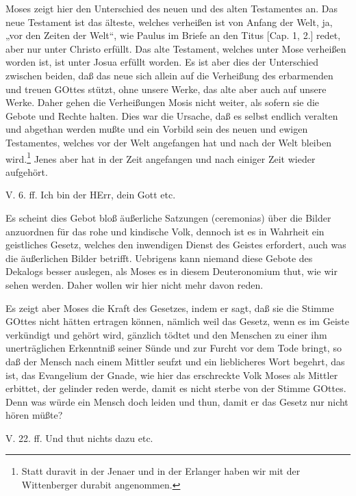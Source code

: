 Moses zeigt hier den Unterschied des neuen und des alten Testamentes an. Das neue Testament ist das älteste, welches verheißen ist von Anfang der Welt, ja, „vor den Zeiten der Welt“, wie Paulus im Briefe an den Titus [Cap. 1, 2.] redet, aber nur unter Christo erfüllt. Das alte Testament, welches unter Mose verheißen worden ist, ist unter Josua erfüllt worden. Es ist aber dies der Unterschied zwischen beiden, daß das neue sich allein auf die Verheißung des erbarmenden und treuen GOttes stützt, ohne unsere Werke, das alte aber auch auf unsere Werke. Daher gehen die Verheißungen Mosis nicht weiter, als sofern sie die Gebote und Rechte halten. Dies war die Ursache, daß es selbst endlich veralten und abgethan werden mußte und ein Vorbild sein des neuen und ewigen Testamentes, welches vor der Welt angefangen hat und nach der Welt bleiben wird.\footnote{Statt duravit in der Jenaer und in der Erlanger haben wir mit der Wittenberger durabit angenommen.} Jenes aber hat in der Zeit angefangen und nach einiger Zeit wieder aufgehört.

\begin{schriftzitat}
V. 6. ff. Ich bin der HErr, dein Gott etc.
\end{schriftzitat}

Es scheint dies Gebot bloß äußerliche Satzungen (ceremonias) über die Bilder anzuordnen für das rohe und kindische Volk, dennoch ist es in Wahrheit ein geistliches Gesetz, welches den inwendigen Dienst des Geistes erfordert, auch was die äußerlichen Bilder betrifft. Uebrigens kann niemand diese Gebote des Dekalogs besser auslegen, als Moses es in diesem Deuteronomium thut, wie wir sehen werden. Daher wollen wir hier nicht mehr davon reden.

Es zeigt aber Moses die Kraft des Gesetzes, indem er sagt, daß sie die Stimme GOttes nicht hätten ertragen können, nämlich weil das Gesetz, wenn es im Geiste verkündigt und gehört wird, gänzlich tödtet und den Menschen zu einer ihm unerträglichen Erkenntniß seiner Sünde und zur Furcht vor dem Tode bringt, so daß der Mensch nach einem Mittler seufzt und ein lieblicheres Wort begehrt, das ist, das Evangelium der Gnade, wie hier das erschreckte Volk Moses als Mittler erbittet, der gelinder reden werde, damit es nicht sterbe von der Stimme GOttes. Denn was würde ein Mensch doch leiden und thun, damit er das Gesetz nur nicht hören müßte?

\begin{schriftzitat}
V. 22. ff. Und thut nichts dazu etc.
\end{schriftzitat}

